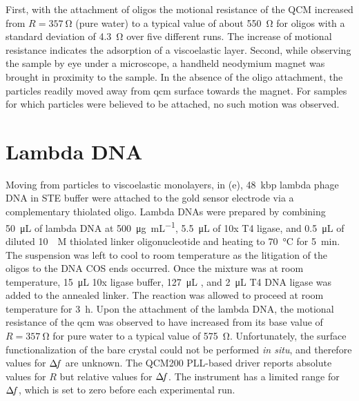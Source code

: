 First, with the attachment of oligos the motional resistance of the QCM
increased from $R=\SI{357}{\ohm}$ (pure water) to a typical value of about
\SI{550}{\ohm} for oligos with a standard deviation of \SI{4.3}{\ohm} over
five different runs.  The increase of motional resistance indicates the
adsorption of a viscoelastic layer.  Second, while observing the sample by
eye under a microscope, a handheld neodymium magnet was brought in
proximity to the sample.  In the absence of the oligo attachment, the
particles readily moved away from \gls{qcm} surface towards the magnet.  For
samples for which particles were believed to be attached, no such motion
was observed.


\section{Lambda DNA}
Moving from particles to viscoelastic monolayers, in
(e), \SI{48}{kbp} lambda phage DNA in STE buffer were
attached to the gold sensor electrode via a complementary thiolated oligo.
Lambda DNAs were prepared by combining \SI{50}{\micro\liter} of lambda DNA
at \SI{500}{\micro\gram\per\milli\liter}, \SI{5.5}{\micro\liter} of 10x T4
ligase, and \SI{0.5}{\micro\liter} of diluted \SI{10}{\micro\textsc{M}}
thiolated linker oligonucleotide and heating to \SI{70}{\celsius} for
\SI{5}{\minute}.  The suspension was left to cool to room temperature as
the litigation of the oligos to the DNA COS ends occurred. Once the mixture
was at room temperature, \SI{15}{\micro\liter} 10x ligase buffer,
\SI{127}{\micro\liter} , and \SI{2}{\micro\liter} T4 DNA ligase was
added to the annealed linker.  The reaction was allowed to proceed at room
temperature for \SI{3}{\hour}.  Upon the attachment of the lambda DNA, the
motional resistance of the \gls{qcm} was observed to have increased from its base
value of $R=\SI{357}{\ohm}$ for pure water to a typical value of
\SI{575}{\ohm}.  Unfortunately, the surface functionalization of the bare
crystal could not be performed \textit{in situ}, and therefore values for
$\Delta\!f$ are unknown.  The QCM200 PLL-based driver reports absolute values for
$R$ but relative values for $\Delta\!f$.  The instrument has a limited range for
$\Delta\!f$, which is set to zero before each experimental run.

